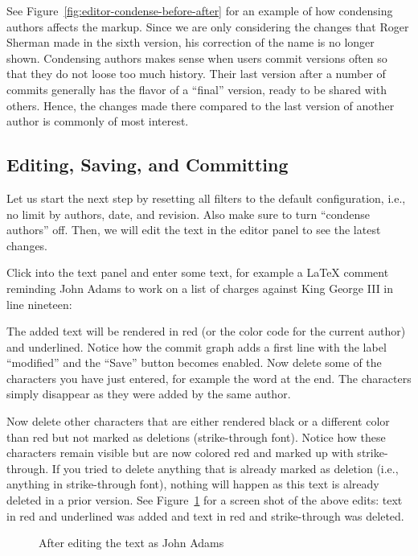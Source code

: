 See Figure~\ref{fig:editor-condense-before-after} for an example of how condensing authors affects the markup.  Since we are only considering the changes that Roger Sherman made in the sixth version, his correction of the name is no longer shown.  Condensing authors makes sense when users commit versions often so that they do not loose too much history.  Their last version after a number of commits generally has the flavor of a ``final'' version, ready to be shared with others.  Hence, the changes made there compared to the last version of another author is commonly of most interest.

\subsection{Editing, Saving, and Committing}

Let us start the next step by resetting all filters to the default configuration, i.e., no limit by authors, date, and revision.  Also make sure to turn ``condense authors'' off.  Then, we will edit the text in the editor panel to see the latest changes.

Click into the text panel and enter some text, for example a LaTeX comment reminding John Adams to work on a list of charges against King George III in line nineteen:
\begin{FileVerbatim}
\end{FileVerbatim}
The added text will be rendered in red (or the color code for the current author) and underlined.  Notice how the commit graph adds a first line with the label ``modified'' and the ``Save'' button becomes enabled.  Now delete some of the characters you have just entered, for example the word  at the end.  The characters simply disappear as they were added by the same author.

Now delete other characters that are either rendered black or a different color than red but not marked as deletions (strike-through font).  Notice how these characters remain visible but are now colored red and marked up with strike-through.  If you tried to delete anything that is already marked as deletion (i.e., anything in strike-through font), nothing will happen as this text is already deleted in a prior version.  See Figure~\ref{fig:editor-modified} for a screen shot of the above edits: text in red and underlined was added and text in red and strike-through was deleted.

\begin{figure}[t]
\centering
{}
\caption{After editing the text as John Adams} \label{fig:editor-modified}
\end{figure}

